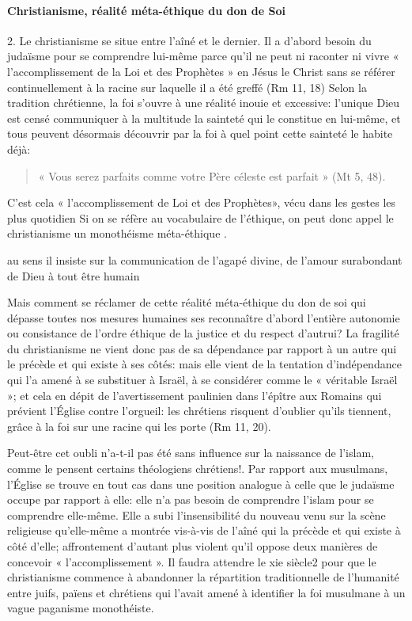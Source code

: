 \paragraph{Christianisme, réalité méta-éthique du don de Soi  } 
2. Le christianisme se situe entre l'aîné et le dernier. Il a d'abord besoin du judaïsme pour se comprendre lui-même parce qu'il ne peut ni raconter ni vivre « l'accomplissement de la Loi et des Prophètes » en Jésus le Christ sans se référer continuellement à la racine sur laquelle il a été greffé (Rm 11, 18) Selon la tradition chrétienne, la foi s'ouvre à une réalité inouie et excessive: l'unique Dieu est censé communiquer à la multitude la sainteté qui le constitue en lui-même, et tous peuvent désormais découvrir par la foi à quel point cette sainteté le habite déjà:
\begin{quote}
    « Vous serez parfaits comme votre Père céleste est parfait » (Mt 5, 48). 
\end{quote}
C'est cela « l'accomplissement de Loi et des Prophètes», vécu dans les gestes les plus quotidien Si on se réfère au vocabulaire de l'éthique, on peut donc appel le christianisme un monothéisme méta-éthique .
\begin{Def}
    au sens il insiste sur la communication de l'agapé divine, de l'amour surabondant de Dieu à tout être humain
\end{Def}
 
Mais comment se réclamer de cette réalité méta-éthique du don de soi qui dépasse toutes nos mesures humaines ses reconnaître d'abord l'entière autonomie ou consistance de l'ordre éthique de la justice et du respect d'autrui? La fragilité du christianisme ne vient donc pas de sa dépendance par rapport à un autre qui le précède et qui existe à ses côtés: mais elle vient de la tentation d'indépendance qui l'a amené à se substituer à Israël, à se considérer comme le « véritable Israël »; et cela en dépit de l'avertissement paulinien dans l'épître aux Romains qui prévient l'Église contre l'orgueil: les chrétiens risquent d'oublier qu'ils tiennent, grâce à la foi sur une racine qui les porte (Rm 11, 20).

Peut-être cet oubli n'a-t-il pas été sans influence sur la naissance de l'islam, comme le pensent certains théologiens chrétiens!. Par rapport aux musulmans, l'Église se trouve en tout cas dans une position analogue à celle que le judaïsme occupe par rapport à elle: elle n'a pas besoin de comprendre l'islam pour se comprendre elle-même. Elle a subi l'insensibilité du nouveau venu sur la scène religieuse qu'elle-même a montrée vis-à-vis de l'aîné qui la précède et qui existe à côté d'elle; affrontement d'autant plus violent qu'il oppose deux manières de concevoir « l'accomplissement ». Il faudra attendre le xie siècle2 pour que le christianisme commence à abandonner la répartition traditionnelle de l'humanité entre juifs, païens et chrétiens qui l'avait amené à identifier la foi musulmane à un vague paganisme monothéiste.

